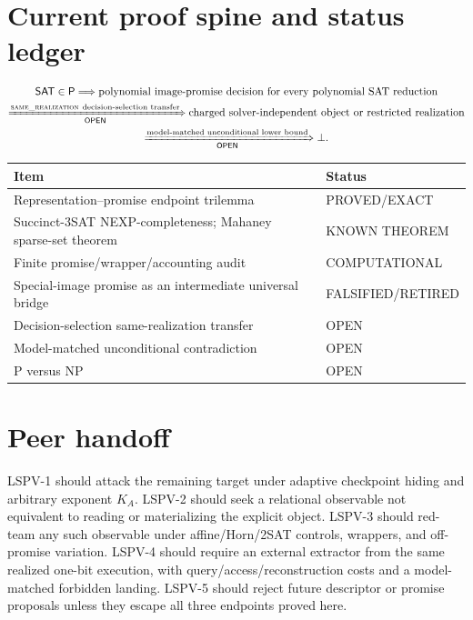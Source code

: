 \documentclass[11pt]{article}
\newcommand{\OPEN}{\textsf{OPEN}}
\newcommand{\EXACT}{\textsf{PROVED/EXACT}}
\newcommand{\KNOWN}{\textsf{KNOWN THEOREM}}
\newcommand{\COMP}{\textsf{COMPUTATIONAL}}
\newcommand{\RET}{\textsf{FALSIFIED/RETIRED}}
\newcommand{\same}{\textnormal{\textsc{same\_realization}}}
\newcommand{\SAT}{\mathsf{SAT}}
\begin{document}
\section*{Current proof spine and status ledger}
\[
\begin{gathered}
 \SAT\in\mathsf P
 \Longrightarrow
 \text{polynomial image-promise decision for every polynomial SAT reduction}
 \\
 \xRightarrow[\text{\OPEN}]{\same\ \text{decision-selection transfer}}
 \text{charged solver-independent object or restricted realization}
 \\
 \xRightarrow[\text{\OPEN}]{\text{model-matched unconditional lower bound}}
 \bot.
\end{gathered}
\]
\begin{center}
\begin{tabular}{p{}p{}}
\toprule
Item & Status\\
\midrule
Representation--promise endpoint trilemma & \EXACT{}\\
Succinct-3SAT NEXP-completeness; Mahaney sparse-set theorem & \KNOWN{}\\
Finite promise/wrapper/accounting audit & \COMP{}\\
Special-image promise as an intermediate universal bridge & \RET{}\\
Decision-selection same-realization transfer & \OPEN{}\\
Model-matched unconditional contradiction & \OPEN{}\\
P versus NP & \OPEN{}\\
\bottomrule
\end{tabular}
\end{center}

\section*{Peer handoff}
LSPV-1 should attack the remaining target under adaptive checkpoint hiding and
arbitrary exponent $K_A$.  LSPV-2 should seek a relational observable not
equivalent to reading or materializing the explicit object.  LSPV-3 should
red-team any such observable under affine/Horn/2SAT controls, wrappers, and
off-promise variation.  LSPV-4 should require an external extractor from the
same realized one-bit execution, with query/access/reconstruction costs and a
model-matched forbidden landing.  LSPV-5 should reject future descriptor or
promise proposals unless they escape all three endpoints proved here.
\end{document}
